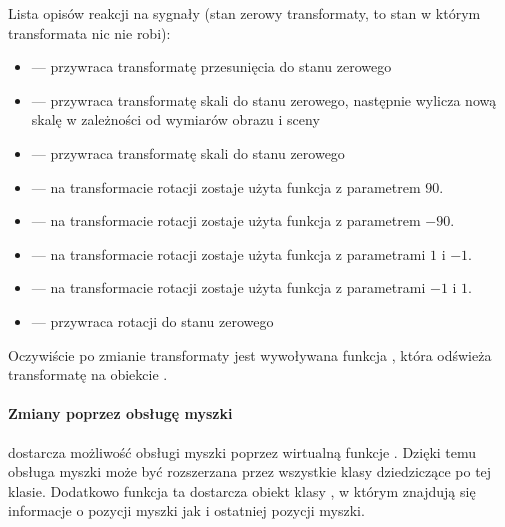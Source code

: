 \par
Lista opisów reakcji na sygnały (stan zerowy transformaty, to stan w którym transformata nic nie robi):
\begin{itemize}

    \item {} --- przywraca transformatę przesunięcia do stanu zerowego

    \item {} --- przywraca transformatę skali do stanu zerowego, następnie wylicza nową skalę w zależności od wymiarów obrazu i sceny

    \item {} --- przywraca transformatę skali do stanu zerowego

    \item {} --- na transformacie rotacji zostaje użyta funkcja  z parametrem $90$.

    \item {} --- na transformacie rotacji zostaje użyta funkcja  z parametrem $-90$.

    \item {} --- na transformacie rotacji zostaje użyta funkcja  z parametrami $1$ i $-1$.

    \item {} --- na transformacie rotacji zostaje użyta funkcja  z parametrami $-1$ i $1$.

    \item {} --- przywraca rotacji do stanu zerowego

\end{itemize}
Oczywiście po zmianie transformaty jest wywoływana funkcja , która odświeża transformatę na obiekcie .

\paragraph{Zmiany poprzez obsługę myszki}

\par
{} dostarcza możliwość obsługi myszki poprzez wirtualną funkcje .
Dzięki temu obsługa myszki może być rozszerzana przez wszystkie klasy dziedziczące po tej klasie.
Dodatkowo funkcja ta dostarcza obiekt klasy , w którym znajdują się informacje o pozycji myszki jak i ostatniej pozycji myszki.

